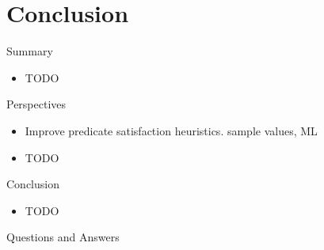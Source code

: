 \section{Conclusion}

\begin{frame}{Summary}
  \begin{itemize}
  \item TODO
  \end{itemize}
\end{frame}

\begin{frame}{Perspectives}
  \begin{itemize}
  \item Improve predicate satisfaction heuristics. \Eg sample values, ML
  \item TODO
  \end{itemize}
\end{frame}

\begin{frame}{Conclusion}
  \begin{itemize}
  \item TODO
  \end{itemize}
\end{frame}

\begin{frame}{Questions and Answers}
\end{frame}
